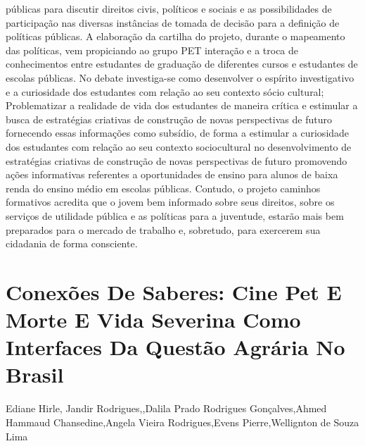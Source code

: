 públicas para discutir direitos civis, políticos e sociais e as possibilidades de participação nas
diversas instâncias de tomada de decisão para a definição de políticas públicas. A elaboração da
cartilha do projeto, durante o mapeamento das políticas, vem propiciando ao grupo PET
interação e a troca de conhecimentos entre estudantes de graduação de diferentes cursos e
estudantes de escolas públicas. No debate investiga-se como desenvolver o espírito investigativo
e a curiosidade dos estudantes com relação ao seu contexto sócio cultural; Problematizar a
realidade de vida dos estudantes de maneira crítica e estimular a busca de estratégias criativas de
construção de novas perspectivas de futuro fornecendo essas informações como subsídio, de
forma a estimular a curiosidade dos estudantes com relação ao seu contexto sociocultural no
desenvolvimento de estratégias criativas de construção de novas perspectivas de futuro
promovendo ações informativas referentes a oportunidades de ensino para alunos de baixa renda
do ensino médio em escolas públicas. Contudo, o projeto caminhos formativos acredita que o
jovem bem informado sobre seus direitos, sobre os serviços de utilidade pública e as políticas
para a juventude, estarão mais bem preparados para o mercado de trabalho e, sobretudo, para
exercerem sua cidadania de forma consciente.




\section*{Conexões De Saberes: Cine Pet E Morte E Vida Severina Como Interfaces Da Questão  Agrária No Brasil}

Ediane Hirle, Jandir Rodrigues,,Dalila Prado  Rodrigues Gonçalves,Ahmed Hammaud Chansedine,Angela Vieira Rodrigues,Evens Pierre,Wellignton de Souza Lima

